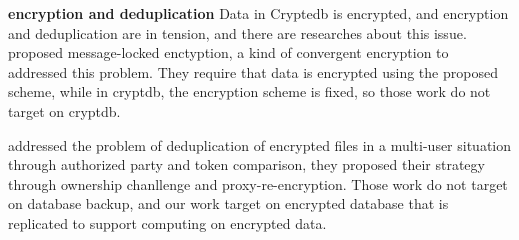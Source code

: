 \textbf{encryption and deduplication} Data in Cryptedb is encrypted, and encryption and deduplication are in tension, and there are researches about this issue.\citep{bellare2013message} \citep{puzio2015perfectdedup} proposed message-locked enctyption, a kind of convergent encryption to addressed this problem. They require that data is encrypted using the proposed scheme, while in cryptdb, the encryption scheme is fixed, so those work do not target on cryptdb.

\citep{yan2016deduplication} addressed the problem of deduplication of encrypted files in a multi-user situation through authorized party and token comparison, they proposed their strategy through ownership chanllenge and proxy-re-encryption. Those work do not target on database backup, and our work target on encrypted database that is replicated to support computing on encrypted data.










